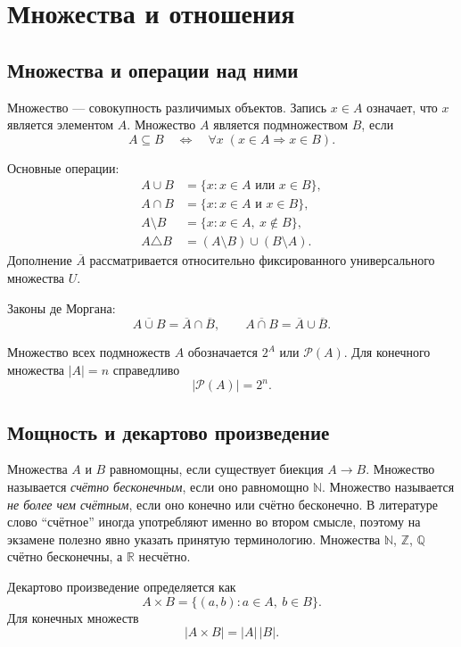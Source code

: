 \section{Множества и отношения}
\label{sec:sets-relations}

\subsection{Множества и операции над ними}

Множество --- совокупность различимых объектов. Запись $x\in A$ означает, что
$x$ является элементом $A$. Множество $A$ является подмножеством $B$, если
\[
    A\subseteq B
    \quad\Longleftrightarrow\quad
    \forall x\;(x\in A\Rightarrow x\in B).
\]

Основные операции:
\[
\begin{aligned}
A\cup B&=\{x:x\in A\text{ или }x\in B\},\\
A\cap B&=\{x:x\in A\text{ и }x\in B\},\\
A\setminus B&=\{x:x\in A,\ x\notin B\},\\
A\triangle B&=(A\setminus B)\cup(B\setminus A).
\end{aligned}
\]
Дополнение $\overline A$ рассматривается относительно фиксированного
универсального множества $U$.

Законы де Моргана:
\[
    \overline{A\cup B}=\overline A\cap\overline B,
    \qquad
    \overline{A\cap B}=\overline A\cup\overline B.
\]

Множество всех подмножеств $A$ обозначается $2^A$ или $\mathcal P(A)$.
Для конечного множества $|A|=n$ справедливо
\[
    |\mathcal P(A)|=2^n.
\]

\subsection{Мощность и декартово произведение}

Множества $A$ и $B$ равномощны, если существует биекция $A\to B$.
Множество называется \emph{счётно бесконечным}, если оно равномощно
$\mathbb N$. Множество называется \emph{не более чем счётным}, если оно конечно
или счётно бесконечно. В литературе слово ``счётное'' иногда употребляют именно
во втором смысле, поэтому на экзамене полезно явно указать принятую терминологию.
Множества $\mathbb N$, $\mathbb Z$, $\mathbb Q$ счётно бесконечны, а
$\mathbb R$ несчётно.

Декартово произведение определяется как
\[
    A\times B=\{(a,b):a\in A,\ b\in B\}.
\]
Для конечных множеств
\[
    |A\times B|=|A|\,|B|.
\]

